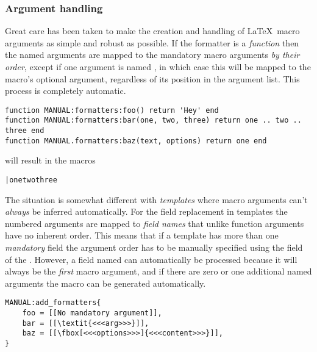 \documentclass[12pt]{scrartcl}
\begin{document}
\subsubsection{Argument handling}
\label{sec:usage-argument-handling}

Great care has been taken to make the creation and handling of \LaTeX\ macro
arguments as simple and robust as possible.  If the formatter is a
\emph{function} then the named arguments are mapped to the mandatory macro
arguments \emph{by their order}, except if one argument is named
, in which case this will be mapped to the macro's optional
argument, regardless of its position in the argument list. This process is
completely automatic.

\begin{verbatim}
function MANUAL:formatters:foo() return 'Hey' end
function MANUAL:formatters:bar(one, two, three) return one .. two .. three end
function MANUAL.formatters:baz(text, options) return one end
\end{verbatim}

\noindent will result in the macros

\begin{itemize*}
\item \texttt{\foo}
\item \texttt{\bar{one}{two}{three}}
\item \texttt{}
\end{itemize*}

\noindent The situation is somewhat different with \emph{templates} where macro
arguments can't \emph{always} be inferred automatically.  For the field
replacement in templates the numbered arguments are mapped to \emph{field names}
that unlike function arguments have no inherent order.  This means that if a
template has more than one \emph{mandatory} field the argument order has to be
manually specified using the  field of the .  However, a field named  can automatically be
processed because it will always be the \emph{first} macro argument, and if
there are zero or one additional named arguments the macro can be generated
automatically.

\begin{verbatim}
MANUAL:add_formatters{
	foo = [[No mandatory argument]],
	bar = [[\textit{<<<arg>>>}]],
	baz = [[\fbox[<<<options>>>]{<<<content>>>}]],
}
\end{verbatim}
\end{document}
